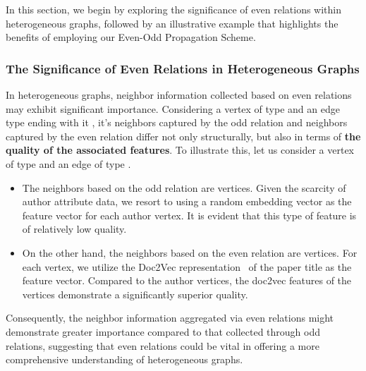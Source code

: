 \documentclass[lettersize,journal]{IEEEtran}
\begin{document}
In this section, we begin by exploring the significance of even relations within heterogeneous graphs, followed by an illustrative example that highlights the benefits of employing our Even-Odd Propagation Scheme.



\subsubsection{The Significance of Even Relations in Heterogeneous Graphs}\label{sec:sig_of_even}
In heterogeneous graphs, neighbor information collected based on even relations may exhibit significant importance.
Considering a vertex of type  and an edge type ending with it , it's neighbors captured by the odd relation  and neighbors captured by the even relation  differ not only structurally, but also in terms of \textbf{the quality of the associated features}.
To illustrate this, let us consider a vertex of type  and an edge of type .
\begin{itemize}
\item The neighbors based on the odd relation  are  vertices. 
Given the scarcity of author attribute data, we resort to using a random embedding vector as the feature vector for each author vertex. 
It is evident that this type of feature is of relatively low quality.
\item On the other hand, the neighbors based on the even relation  are  vertices. 
For each  vertex, we utilize the Doc2Vec representation~\cite{DBLP:conf/icml/LeM14} of the paper title as the feature vector. 
Compared to the author vertices, the doc2vec features of the  vertices demonstrate a significantly superior quality.
\end{itemize}
Consequently, the neighbor information aggregated via even relations might demonstrate greater importance compared to that collected through odd relations, suggesting that even relations could be vital in offering a more comprehensive understanding of heterogeneous graphs.
\end{document}
